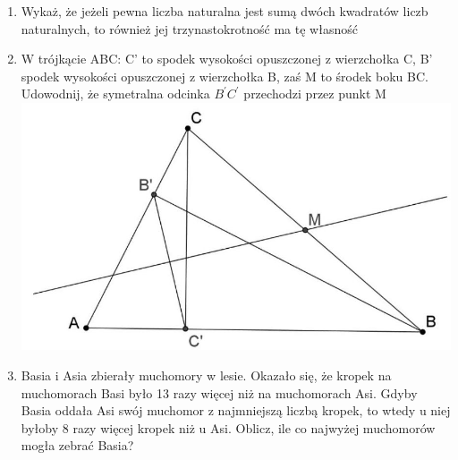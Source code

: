 \documentclass[10pt]{article}
\begin{document}
\begin{enumerate}
  \item Wykaż, że jeżeli pewna liczba naturalna jest sumą dwóch kwadratów liczb naturalnych, to również jej trzynastokrotność ma tę własność
  \item W trójkącie ABC: C' to spodek wysokości opuszczonej z wierzchołka C, B' spodek wysokości opuszczonej z wierzchołka B, zaś M to środek boku BC. Udowodnij, że symetralna odcinka \(B^{\prime} C^{\prime}\) przechodzi przez punkt M\\
\includegraphics[max width=\textwidth, center]{2024_11_21_be053e1ed6379189d5d2g-1}
  \item Basia i Asia zbierały muchomory w lesie. Okazało się, że kropek na muchomorach Basi było 13 razy więcej niż na muchomorach Asi. Gdyby Basia oddała Asi swój muchomor z najmniejszą liczbą kropek, to wtedy u niej byłoby 8 razy więcej kropek niż u Asi. Oblicz, ile co najwyżej muchomorów mogła zebrać Basia?
\end{enumerate}
\end{document}
